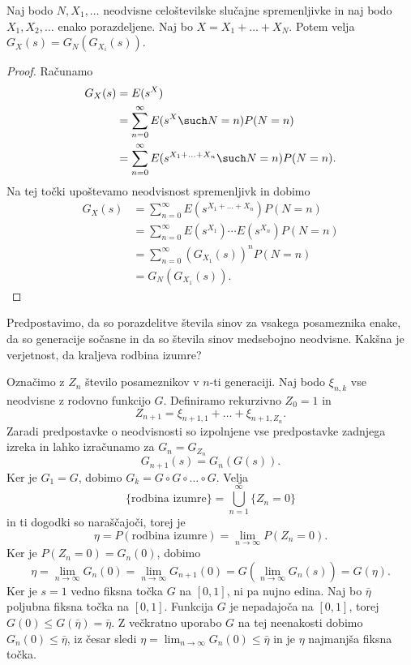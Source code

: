 
\begin{izrek}
  Naj bodo $N, X_1, \ldots$ neodvisne celoštevilske slučajne spremenljivke in
  naj bodo $X_1, X_2, \ldots$ enako porazdeljene.
  Naj bo $X = X_1 + \ldots + X_N$.
  Potem velja $G_X(s) = G_N(G_{X_i}(s))$.
\end{izrek}

\begin{proof}
  Računamo
  \begin{align*}
	G_X(s)
	&= E(s^X) \\
	&= \sum_{n=0}^\infty E(s^X \such N = n) P(N = n) \\
	&= \sum_{n=0}^\infty E(s^{X_1 + \ldots + X_n} \such N = n) P(N = n).
  \end{align*}
  Na tej točki upoštevamo neodvisnost spremenljivk in dobimo
  \begin{align*}
	G_X(s)
	&= \sum_{n=0}^\infty E(s^{X_1 + \ldots + X_n}) P(N = n) \\
	&= \sum_{n=0}^\infty E(s^{X_1}) \cdots E(s^{X_n}) P(N = n) \\
	&= \sum_{n=0}^\infty (G_{X_1}(s))^n P(N=n) \\
	&= G_N(G_{X_1}(s)).
  \end{align*}
\end{proof}



Predpostavimo, da so porazdelitve števila sinov za vsakega posameznika enake, da
so generacije sočasne in da so števila sinov medsebojno neodvisne.
Kakšna je verjetnost, da kraljeva rodbina izumre?

Označimo z $Z_n$ število posameznikov v $n$-ti generaciji.
Naj bodo $\xi_{n,k}$ vse neodvisne z rodovno funkcijo $G$.
Definiramo rekurzivno $Z_0 = 1$ in
\[
  Z_{n+1} = \xi_{n+1,1} + \ldots + \xi_{n+1,Z_n}.
\]
Zaradi predpostavke o neodvisnosti so izpolnjene vse predpostavke zadnjega
izreka in lahko izračunamo za $G_n = G_{Z_n}$
\[
  G_{n+1}(s) = G_n(G(s)).
\]
Ker je $G_1 = G$, dobimo $G_k = G \circ G \circ \ldots \circ G$.
Velja
\[
  \{\text{rodbina izumre}\} = \bigcup_{n=1}^\infty \{Z_n = 0\}
\]
in ti dogodki so naraščajoči, torej je
\[
  \eta = P(\text{rodbina izumre}) = \lim_{n \to \infty} P(Z_n = 0).
\]
Ker je $P(Z_n = 0) = G_n(0)$, dobimo
\[
  \eta = \lim_{n \to \infty} G_n(0) = \lim_{n \to \infty} G_{n+1}(0)
  = G(\lim_{n \to \infty} G_n(s)) = G(\eta).
\]
Ker je $s = 1$ vedno fiksna točka $G$ na $[0,1]$, ni pa nujno edina.
Naj bo $\bar{\eta}$ poljubna fiksna točka na $[0,1]$.
Funkcija $G$ je nepadajoča na $[0,1]$, torej $G(0) \le G(\bar{\eta}) =
\bar{\eta}$.
Z večkratno uporabo $G$ na tej neenakosti dobimo $G_n(0) \le \bar{\eta}$, iz
česar sledi $\eta = \lim_{n \to \infty} G_n(0) \le \bar{\eta}$ in je $\eta$
najmanjša fiksna točka.

